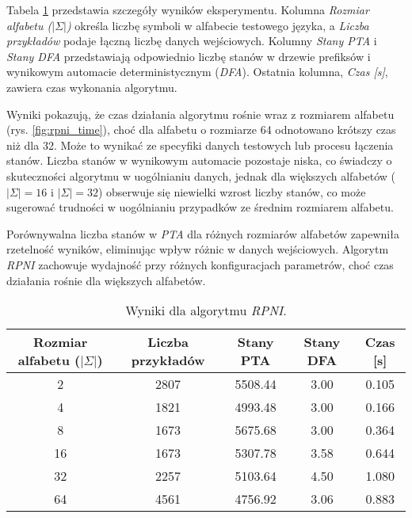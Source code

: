 Tabela \ref{tab:rpni_results} przedstawia szczegóły wyników eksperymentu. Kolumna \textit{Rozmiar alfabetu (\(|\Sigma|\))} określa liczbę symboli w alfabecie testowego języka, a \textit{Liczba przykładów} podaje łączną liczbę danych wejściowych. Kolumny \textit{Stany PTA} i \textit{Stany DFA} przedstawiają odpowiednio liczbę stanów w drzewie prefiksów i wynikowym automacie deterministycznym (\textit{DFA}). Ostatnia kolumna, \textit{Czas [s]}, zawiera czas wykonania algorytmu.  

Wyniki pokazują, że czas działania algorytmu rośnie wraz z rozmiarem alfabetu (rys. \ref{fig:rpni_time}), choć dla alfabetu o rozmiarze 64 odnotowano krótszy czas niż dla 32. Może to wynikać ze specyfiki danych testowych lub procesu łączenia stanów. Liczba stanów w wynikowym automacie pozostaje niska, co świadczy o skuteczności algorytmu w uogólnianiu danych, jednak dla większych alfabetów (\(|\Sigma| = 16\) i \(|\Sigma| = 32\)) obserwuje się niewielki wzrost liczby stanów, co może sugerować trudności w uogólnianiu przypadków ze średnim rozmiarem alfabetu.  

Porównywalna liczba stanów w \textit{PTA} dla różnych rozmiarów alfabetów zapewniła rzetelność wyników, eliminując wpływ różnic w danych wejściowych. Algorytm \textit{RPNI} zachowuje wydajność przy różnych konfiguracjach parametrów, choć czas działania rośnie dla większych alfabetów.

\begin{table}[h]
\centering
\caption{Wyniki dla algorytmu \textit{RPNI}.}
\label{tab:rpni_results}
\begin{tabular}{|c|c|c|c|c|}
\hline
Rozmiar alfabetu (\(|\Sigma|\)) & Liczba przykładów & Stany PTA & Stany DFA & Czas [s] \\ \hline
\num{2}                         & \num{2807}        & \num{5508.44} & \num{3.00}      & \num{0.105} \\ \hline
\num{4}                         & \num{1821}        & \num{4993.48} & \num{3.00}      & \num{0.166} \\ \hline
\num{8}                         & \num{1673}        & \num{5675.68} & \num{3.00}      & \num{0.364} \\ \hline
\num{16}                        & \num{1673}        & \num{5307.78} & \num{3.58}   & \num{0.644} \\ \hline
\num{32}                        & \num{2257}        & \num{5103.64} & \num{4.50}   & \num{1.080} \\ \hline
\num{64}                        & \num{4561}        & \num{4756.92} & \num{3.06}   & \num{0.883} \\ \hline
\end{tabular}
\end{table}

